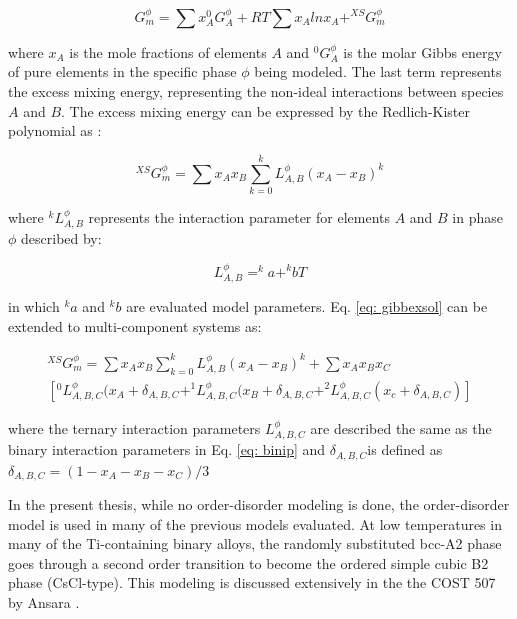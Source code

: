 \begin{equation}
\label{eq: gibbssolution}
G_m^{\phi} = \sum x_{A} ^{0}G_{A}^{\phi} + R T \sum x_{A} ln x_{A} + ^{XS}G_{m}^{\phi}
\end{equation}

\noindent where $x_{A}$ is the mole fractions of elements $A$ and $^{0}G_{A}^{\phi}$ is the molar Gibbs energy of pure elements in the specific phase $\phi$ being modeled. The last term represents the excess mixing energy, representing the non-ideal interactions between species $A$ and $B$. The excess mixing energy can be expressed by the Redlich-Kister polynomial as \cite{Redlich1948b}: 

\begin{equation}
\label{eq: gibbexsol}
^{XS}G_m^{\phi} = \sum x_{A} x_{B} \sum_{k=0} ^{k}L_{A,B}^{\phi} (x_{A} - x_{B})^k
\end{equation}

\noindent where $^kL_{A,B}^{\phi}$ represents the interaction parameter for elements $A$ and $B$ in phase $\phi$ described by:

\begin{equation}
\label{eq: binip}
L_{A,B}^{\phi} = ^{k}a + ^{k}bT
\end{equation}

\noindent in which $^{k}a$ and $^{k}b$ are evaluated model parameters. Eq. \ref{eq: gibbexsol} can be extended to multi-component systems as:

\begin{multline}
\label{eq: gibbexsolmulti}
^{XS}G_m^{\phi} = \sum x_{A} x_{B} \sum_{k=0} ^{k}L_{A,B}^{\phi} (x_{A} - x_{B})^k + \sum x_{A} x_{B} x_{C} \\ \left[ ^{0}L_{A, B, C}^{\phi} (x_{A} + \delta_{A, B, C} + ^{1}L_{A, B, C}^{\phi} (x_{B} + \delta_{A, B, C} + ^{2}L_{A, B, C}^{\phi} (x_{c} + \delta_{A, B, C} ) \right]
\end{multline}

\noindent where the ternary interaction parameters $L_{A, B, C}^{\phi}$ are described the same as the binary interaction parameters in Eq. \ref{eq: binip} and $\delta_{A, B, C}$is defined as $\delta_{A, B, C} = ( 1 - x_{A} - x_{B} - x_{C})/3$

In the present thesis, while no order-disorder modeling is done, the order-disorder model is used in many of the previous models evaluated. At low temperatures in many of the Ti-containing binary alloys, the randomly substituted bcc-A2 phase goes through a second order transition to become the ordered simple cubic B2 phase (CsCl-type). This modeling is discussed extensively in the the COST 507 by Ansara \cite{Ansara1998}. 

